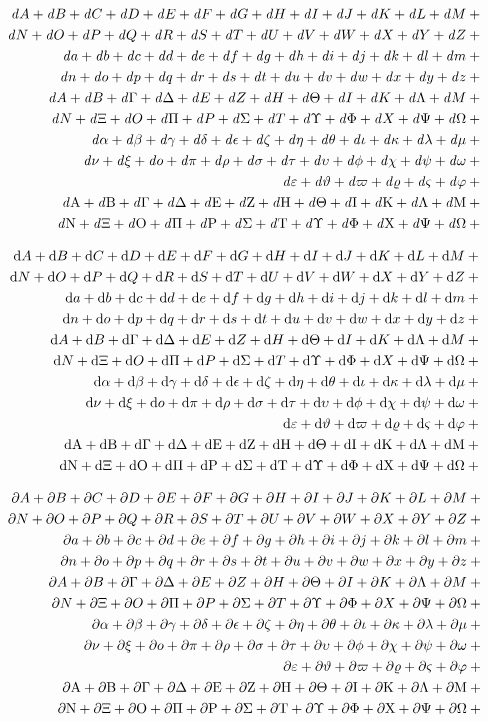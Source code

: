 \documentclass[12pt, a4paper, oneside]{article}
\theoremstyle{Plain}
\theoremstyle{Definition}
\theoremstyle{Remark}
\begin{document}
\begin{appendix}
\begin{eqnarray*}
\gdef\test#1{\dit #1+{}}%
  && {\testupperi}\\
  && {\testupperii}\\
  && {\testloweri}\\
  && {\testlowerii}\\
  && {\testupgreeki}\\
  && {\testupgreekii}\\
  && {\testlowgreeki}\\
  && {\testlowgreekii}\\
  && {\testlowgreekiii}\\
\gdef\test#1{\dit \mathrm{#1}+{}}%
  && {\testupgreeki}\\
  && {\testupgreekii}
\end{eqnarray*}%

\begin{eqnarray*}
\gdef\test#1{\dup #1+{}}%
  && {\testupperi}\\
  && {\testupperii}\\
  && {\testloweri}\\
  && {\testlowerii}\\
  && {\testupgreeki}\\
  && {\testupgreekii}\\
  && {\testlowgreeki}\\
  && {\testlowgreekii}\\
  && {\testlowgreekiii}\\
\gdef\test#1{\dup \mathrm{#1}+{}}%
  && {\testupgreeki}\\
  && {\testupgreekii}
\end{eqnarray*}%

\begin{eqnarray*}
\gdef\test#1{\partial #1+{}}%
  && {\testupperi}\\
  && {\testupperii}\\
  && {\testloweri}\\
  && {\testlowerii}\\
  && {\testupgreeki}\\
  && {\testupgreekii}\\
  && {\testlowgreeki}\\
  && {\testlowgreekii}\\
  && {\testlowgreekiii}\\
\gdef\test#1{\partial \mathrm{#1}+{}}%
  && {\testupgreeki}\\
  && {\testupgreekii}
\end{eqnarray*}%



\end{appendix}
\end{document}
